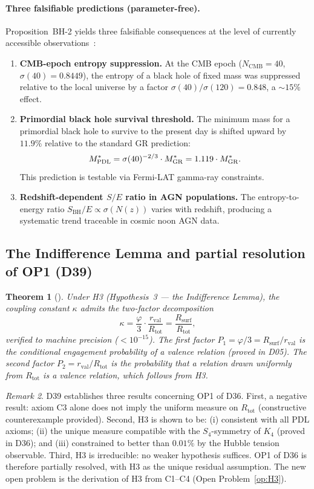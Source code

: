\documentclass[11pt,a4paper]{article}
\theoremstyle{plain}
\newtheorem{theorem}{Theorem}[section]
\theoremstyle{definition}
\theoremstyle{remark}
\newtheorem{remark}[theorem]{Remark}
\newcommand{\PDL}{\textnormal{PDL}}
\newcommand{\Kfour}{K_4}
\newcommand{\rval}{r_{\mathrm{val}}}
\newcommand{\Rsurf}{R_{\mathrm{surf}}}
\newcommand{\Rtot}{R_{\mathrm{tot}}}
\newcommand{\SBH}{S_{\mathrm{BH}}}
\begin{document}
\paragraph{Three falsifiable predictions (parameter-free).}
Proposition~BH-2 yields three falsifiable consequences at the level of currently accessible observations~\citep{D38}:
\begin{enumerate}
\item \textbf{CMB-epoch entropy suppression.} At the CMB epoch ($N_{\mathrm{CMB}}=40$, $\sigma(40)=0.8449$), the entropy of a black hole of fixed mass was suppressed relative to the local universe by a factor $\sigma(40)/\sigma(120)=0.848$, a $\sim 15\%$ effect.
\item \textbf{Primordial black hole survival threshold.} The minimum mass for a primordial black hole to survive to the present day is shifted upward by $11.9\%$ relative to the standard GR prediction:
\[
M^*_{\PDL} = \sigma(40)^{-2/3}\cdot M^*_{\mathrm{GR}} = 1.119\cdot M^*_{\mathrm{GR}}.
\]
This prediction is testable via Fermi-LAT gamma-ray constraints.
\item \textbf{Redshift-dependent $S/E$ ratio in AGN populations.} The entropy-to-energy ratio $\SBH/E \propto \sigma(N(z))$ varies with redshift, producing a systematic trend traceable in cosmic noon AGN data.
\end{enumerate}

\subsection{The Indifference Lemma and partial resolution of OP1 (D39)}
\label{subsec:d39}

\begin{theorem}[\citep{D39}]
\label{thm:D39}
Under H3 (Hypothesis~3 — the Indifference Lemma), the coupling constant $\kappa$ admits the two-factor decomposition
\[
\kappa = \frac{\varphi}{3}\cdot\frac{\rval}{\Rtot} = \frac{\Rsurf}{\Rtot},
\]
verified to machine precision ($<10^{-15}$).
The first factor $P_1 = \varphi/3 = \Rsurf/\rval$ is the conditional engagement probability of a valence relation (proved in D05).
The second factor $P_2 = \rval/\Rtot$ is the probability that a relation drawn uniformly from $\Rtot$ is a valence relation, which follows from H3.
\end{theorem}

\begin{remark}
D39 establishes three results concerning OP1 of D36.
First, a negative result: axiom C3 alone does not imply the uniform measure on $\Rtot$ (constructive counterexample provided).
Second, H3 is shown to be: (i) consistent with all PDL axioms; (ii) the unique measure compatible with the $S_4$-symmetry of $\Kfour$ (proved in D36); and (iii) constrained to better than $0.01\%$ by the Hubble tension observable.
Third, H3 is irreducible: no weaker hypothesis suffices.
OP1 of D36 is therefore partially resolved, with H3 as the unique residual assumption.
The new open problem is the derivation of H3 from C1--C4 (Open Problem~\ref{op:H3}).
\end{remark}
\end{document}
